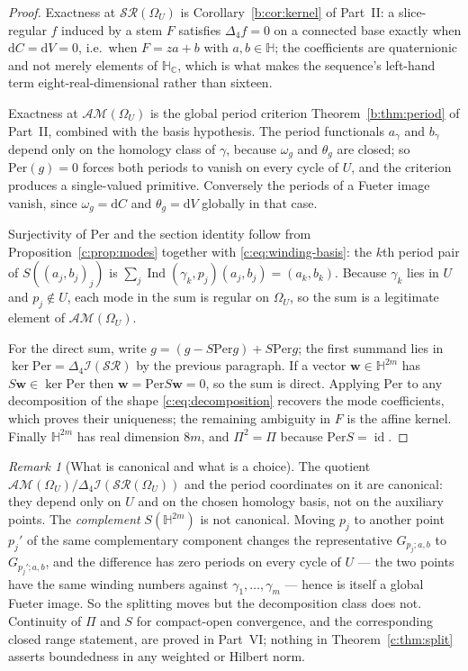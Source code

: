 \documentclass[11pt,a4paper]{article}
\numberwithin{equation}{section}
\theoremstyle{definition}
\theoremstyle{remark}
\newtheorem{remark}[theorem]{Remark}
\theoremstyle{plain}
\newcommand{\HH}{\mathbb H}
\newcommand{\HC}{\mathbb H_{\mathbb C}}
\DeclareMathOperator{\Ind}{Ind}
\newcommand{\lap}{\Delta_4}
\newcommand{\I}{\mathcal I}
\newcommand{\SR}{\mathcal{SR}}
\newcommand{\AM}{\mathcal{AM}}
\newcommand{\Om}{\Omega}
\newcommand{\om}{\omega}
\newcommand{\thet}{\theta}
\newcommand{\Per}{\mathrm{Per}}
\newcommand{\pot}{C}          %
\newcommand{\potV}{V}         %
\newcommand{\dd}{\mathrm d}
\begin{document}
\begin{proof}
Exactness at $\SR(\Om_U)$ is Corollary~\ref{b:cor:kernel} of Part~II: a
slice-regular $f$ induced by a stem $F$ satisfies $\lap f=0$ on a
connected base exactly when $\dd\pot=\dd\potV=0$, i.e.\ when $F=za+b$
with $a,b\in\HH$; the coefficients are quaternionic and not merely
elements of $\HC$, which is what makes the sequence's left-hand term
eight-real-dimensional rather than sixteen.

Exactness at $\AM(\Om_U)$ is the global period criterion Theorem~\ref{b:thm:period} of Part~II, combined with the basis hypothesis.  The period functionals $a_\gamma$
and $b_\gamma$ depend only on the homology class of $\gamma$, because
$\om_g$ and $\thet_g$ are closed; so $\Per(g)=0$ forces both periods to
vanish on every cycle of $U$, and the criterion produces a single-valued
primitive.  Conversely the periods of a Fueter image vanish, since
$\om_g=\dd\pot$ and $\thet_g=\dd\potV$ globally in that case.

Surjectivity of $\Per$ and the section identity follow from
Proposition~\ref{c:prop:modes} together with \eqref{c:eq:winding-basis}:
the $k$th period pair of $S((a_j,b_j)_j)$ is
$\sum_j\Ind(\gamma_k,p_j)(a_j,b_j)=(a_k,b_k)$.  Because $\gamma_k$ lies
in $U$ and $p_j\notin U$, each mode in the sum is regular on $\Om_U$, so
the sum is a legitimate element of $\AM(\Om_U)$.

For the direct sum, write $g=(g-S\Per g)+S\Per g$; the first summand
lies in $\ker\Per=\lap\I(\SR)$ by the previous paragraph.  If a vector
$\mathbf w\in\HH^{2m}$ has $S\mathbf w\in\ker\Per$ then
$\mathbf w=\Per S\mathbf w=0$, so the sum is direct.  Applying $\Per$ to
any decomposition of the shape \eqref{c:eq:decomposition} recovers the
mode coefficients, which proves their uniqueness; the remaining ambiguity
in $F$ is the affine kernel.  Finally $\HH^{2m}$ has real dimension $8m$,
and $\Pi^2=\Pi$ because $\Per S=\operatorname{id}$.
\end{proof}

\begin{remark}[What is canonical and what is a choice]
\label{c:rem:canonical}
The quotient $\AM(\Om_U)/\lap\I(\SR(\Om_U))$ and the period coordinates
on it are canonical: they depend only on $U$ and on the chosen homology
basis, not on the auxiliary points.  The \emph{complement}
$S(\HH^{2m})$ is not canonical.  Moving $p_j$ to another point $p_j'$
of the same complementary component changes the representative
$G_{p_j;a,b}$ to $G_{p_j';a,b}$, and the difference has zero periods on
every cycle of $U$ — the two points have the same winding numbers against
$\gamma_1,\dots,\gamma_m$ — hence is itself a global Fueter image.  So
the splitting moves but the decomposition class does not.  Continuity of
$\Pi$ and $S$ for compact-open convergence, and the corresponding closed
range statement, are proved in Part~VI; nothing in
Theorem~\ref{c:thm:split} asserts boundedness in any weighted or Hilbert
norm.
\end{remark}
\end{document}
